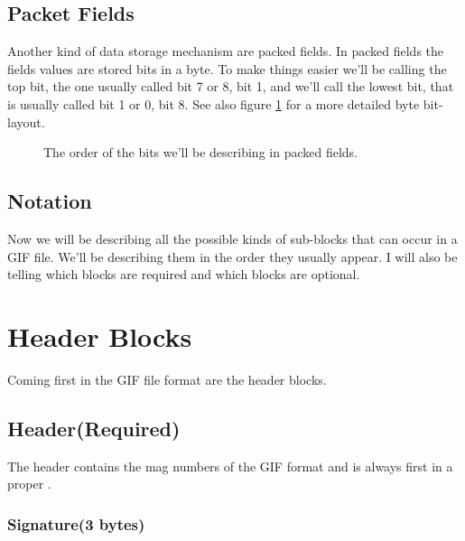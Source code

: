 \begin{refsection}
\begin{algorithm}[H]
\begin{algorithmic}[1]

    \end{algorithmic}
  \end{algorithm}


  \subsection{Packet Fields}

  Another kind of data storage mechanism are packed fields. In packed
  fields the fields values are stored bits in a byte. To make things
  easier we'll be calling the top bit, the one usually called bit 7 or
  8, bit 1, and we'll call the lowest bit, that is usually called bit
  1 or 0, bit 8. See also figure \ref{fig:gif-packed-fields} for a
  more detailed byte bit-layout.

  \begin{figure}
    \centering
    \caption{The order of the bits we'll be describing in packed fields.}
    \label{fig:gif-packed-fields}
  \end{figure}

  \subsection{Notation}

  Now we will be describing all the possible kinds of sub-blocks that
  can occur in a GIF file. We'll be describing them in the order they
  usually appear. I will also be telling which blocks are required and
  which blocks are optional.

  \section{Header Blocks}

  Coming first in the GIF file format are the header blocks.

  \subsection{Header(Required)}

  The header contains the mag numbers of the GIF format and is always
  first in a proper \gif.

  \subsubsection*{Signature(3 bytes)}


\end{refsection}
